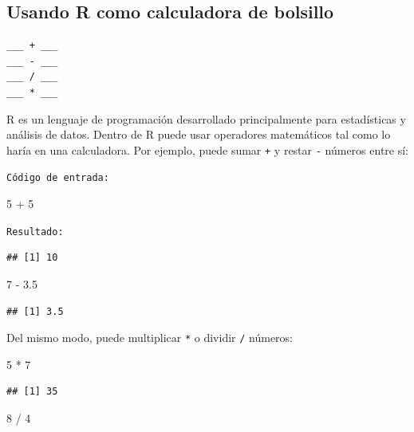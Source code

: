 \documentclass[
]{book}
\newenvironment{Shaded}{\begin{snugshade}}{\end{snugshade}}
\newcommand{\DecValTok}[1]{\textcolor[rgb]{0.00,0.00,0.81}{#1}}
\newcommand{\FloatTok}[1]{\textcolor[rgb]{0.00,0.00,0.81}{#1}}
\newcommand{\SpecialCharTok}[1]{\textcolor[rgb]{0.00,0.00,0.00}{#1}}
\begin{document}
\hypertarget{usando-r-como-calculadora-de-bolsillo}{%
\subsection{Usando R como calculadora de bolsillo}\label{usando-r-como-calculadora-de-bolsillo}}

\begin{verbatim}
___ + ___
___ - ___
___ / ___
___ * ___
\end{verbatim}

R es un lenguaje de programación desarrollado principalmente para estadísticas y análisis de datos. Dentro de R puede usar operadores matemáticos tal como lo haría en una calculadora. Por ejemplo, puede sumar \texttt{+} y restar \texttt{-} números entre sí:

\texttt{Código\ de\ entrada:}

\begin{Shaded}
\begin{Highlighting}[]
\DecValTok{5} \SpecialCharTok{+} \DecValTok{5}
\end{Highlighting}
\end{Shaded}

\texttt{Resultado:}

\begin{verbatim}
## [1] 10
\end{verbatim}

\begin{Shaded}
\begin{Highlighting}[]
\DecValTok{7} \SpecialCharTok{{-}} \FloatTok{3.5}
\end{Highlighting}
\end{Shaded}

\begin{verbatim}
## [1] 3.5
\end{verbatim}

Del mismo modo, puede multiplicar \texttt{*} o dividir \texttt{/} números:

\begin{Shaded}
\begin{Highlighting}[]
\DecValTok{5} \SpecialCharTok{*} \DecValTok{7}   
\end{Highlighting}
\end{Shaded}

\begin{verbatim}
## [1] 35
\end{verbatim}

\begin{Shaded}
\begin{Highlighting}[]
\DecValTok{8} \SpecialCharTok{/} \DecValTok{4}   
\end{Highlighting}
\end{Shaded}
\end{document}
